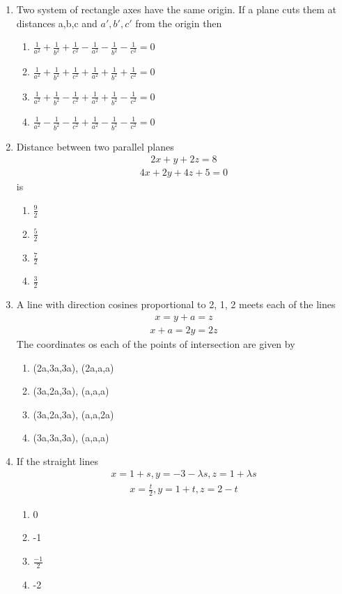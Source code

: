 \begin{enumerate}[label=\arabic*.,ref=\thesubsection.\theenumi]
\item Two system of rectangle axes have the same origin. If a plane cuts them at distances a,b,c and $a',b',c'$ from the origin then
\begin{enumerate}
\item $\frac{1}{a^2}+\frac{1}{b^2}+\frac{1}{c^2}-\frac{1}{a^2}-\frac{1}{b^2}-\frac{1}{c^2}=0$
\item $\frac{1}{a^2}+\frac{1}{b^2}+\frac{1}{c^2}+\frac{1}{a^2}+\frac{1}{b^2}+\frac{1}{c^2}=0$
\item $\frac{1}{a^2}+\frac{1}{b^2}-\frac{1}{c^2}+\frac{1}{a^2}+\frac{1}{b^2}-\frac{1}{c^2}=0$
\item $\frac{1}{a^2}-\frac{1}{b^2}-\frac{1}{c^2}+\frac{1}{a^2}-\frac{1}{b^2}-\frac{1}{c^2}=0$
\end{enumerate}

\item Distance between two parallel planes 
\begin{align}
2x+y+2z=8
\end{align}
\begin{align}
4x+2y+4z+5=0
\end{align}
is
\begin{enumerate}
\item $\frac{9}{2}$
\item $\frac{5}{2}$
\item $\frac{7}{2}$
\item $\frac{3}{2}$
\end{enumerate}

\item A line with direction cosines proportional to 2, 1, 2 meets each of the lines 
\begin{align}
x=y+a=z
\end{align}
\begin{align}
x+a=2y=2z
\end{align}
The coordinates os each of the points of intersection are given by
\begin{enumerate}
\item (2a,3a,3a), (2a,a,a)
\item (3a,2a,3a), (a,a,a)
\item (3a,2a,3a), (a,a,2a)
\item (3a,3a,3a), (a,a,a)
\end{enumerate}

\item If the straight lines
\begin{align}
x=1+s, y=-3-\lambda s, z=1+\lambda s
\end{align}
\begin{align}
x=\frac{t}{2}, y=1+t, z=2-t
\end{align}
\begin{enumerate}
\item 0
\item -1
\item $\frac{-1}{2}$
\item -2
\end{enumerate}


\end{enumerate}
